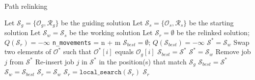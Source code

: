 \begin{algorithm}[htbp!]
\caption{Path relinking}
\label{alg::path_relinking}
\begin{algorithmic}[1]
\State Let $\mathcal{S}_g = \{\mathcal{O}_g, \mathcal{R}_g\}$ be the guiding solution
\State Let $\mathcal{S}_s = \{\mathcal{O}_s, \mathcal{R}_s\}$ be the starting solution
\State Let $\mathcal{S}_w = \mathcal{S}_s$ be the working solution
\State Let $\mathcal{S}_r = \emptyset$ be the relinked solution;  $Q(\mathcal{S}_r) = -\infty$
\State \texttt{n\_movements} = n + m
 \label{alg:pr:main_while}
		\State $\mathcal{S}_{best} = \emptyset$; $Q(\mathcal{S}_{best}) = -\infty$
			\State $\mathcal{S}^* = \mathcal{S}_w$
				\State Swap two elements of $\mathcal{O}^*$ such that $\mathcal{O}^*[i]$ equals $\mathcal{O}_g[i]$
					\State $\mathcal{S}_{best} = \mathcal{S^*}$
				\EndIf
			\EndIf
		\EndFor %
			\State $\mathcal{S}^* = \mathcal{S}_w$
				\State Remove job $j$ from $\mathcal{S^*}$
				\State Re-insert job $j$ in $\mathcal{S^*}$ in the position(s) that match $\mathcal{S}_g$ \label{alg:pr:for_insertion}
				\State $\mathcal{S}_{best} = \mathcal{S^*}$
			\EndIf
		\EndFor %
		\State $\mathcal{S}_w = \mathcal{S}_{best}$
			\State $\mathcal{S}_r = \mathcal{S}_w$
		\EndIf
	\EndFor
\EndWhile
\State $\mathcal{S}_r = \texttt{local\_search}(\mathcal{S}_r)$
\Return $\mathcal{S}_r$

\end{algorithmic}
\end{algorithm}
